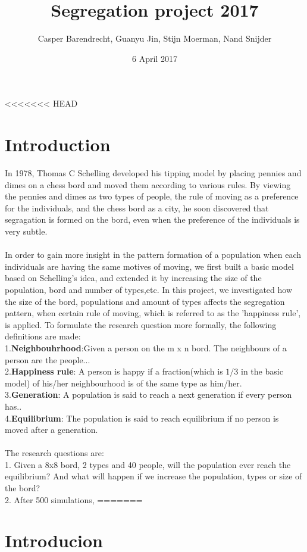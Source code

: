 \documentclass{article}
\title{Segregation project 2017}
\author{Casper Barendrecht, Guanyu Jin, Stijn Moerman, Nand Snijder}
\date{6 April 2017}
\begin{document}
\reversemarginpar 
\maketitle
<<<<<<< HEAD
\section{Introduction}
In 1978, Thomas C Schelling developed his tipping model by placing pennies and dimes on a chess bord and moved them according to various rules. By viewing the pennies and dimes as two types of people, the rule of moving as a preference for the individuals, and the chess bord as a city, he soon discovered that segragation is formed on the bord, even when the preference of the individuals is very subtle.\\
\\
In order to gain more insight in the pattern formation of a population when each individuals are having the same motives of moving, we first built a basic model based on Schelling's idea, and extended it by increasing the size of the population, bord and number of types,etc. In this project, we investigated how the size of the bord, populations and amount of types affects the segregation pattern, when certain rule of moving, which is referred to as the 'happiness rule', is applied. To formulate the research question more formally, the following definitions are made:\\
1.\textbf{Neighbouhrhood}:Given a person on the m x n bord. The neighbours of a person are the people... \\
2.\textbf{Happiness rule}: A person is happy if a fraction(which is $1/3$ in the basic model) of his/her neighbourhood is of the same type as him/her.\\
3.\textbf{Generation}: A population is said to reach a next generation if every person has.. \\
4.\textbf{Equilibrium}: The population is said to reach equilibrium if no person is moved after a generation.\\
\\
The research questions are:\\
1. Given a 8x8 bord, 2 types and 40 people, will the population ever reach the equilibrium? And what will happen if we increase the population, types or size of the bord?\\
2. After 500 simulations, 
=======
\section{Introducion}
\end{document}
